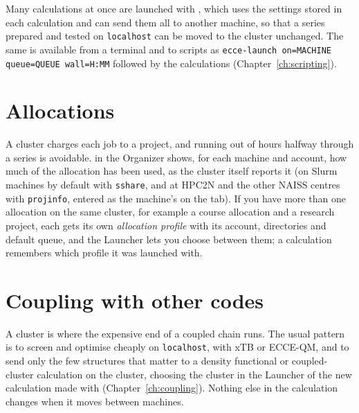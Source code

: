 Many calculations at once are launched with , which uses the settings stored in each calculation and can send them all to another machine, so that a series prepared and tested on \texttt{localhost} can be moved to the cluster unchanged. The same is available from a terminal and to scripts as \texttt{ecce-launch on=MACHINE queue=QUEUE wall=H:MM} followed by the calculations (Chapter~\ref{ch:scripting}).

\section{Allocations}
A cluster charges each job to a project, and running out of hours halfway through a series is avoidable.  in the Organizer shows, for each machine and account, how much of the allocation has been used, as the cluster itself reports it (on Slurm machines by default with \texttt{sshare}, and at HPC2N and the other NAISS centres with \texttt{projinfo}, entered as the machine's  on the  tab). If you have more than one allocation on the same cluster, for example a course allocation and a research project, each gets its own \emph{allocation profile} with its account, directories and default queue, and the Launcher lets you choose between them; a calculation remembers which profile it was launched with.

\section{Coupling with other codes}
A cluster is where the expensive end of a coupled chain runs. The usual pattern is to screen and optimise cheaply on \texttt{localhost}, with xTB or ECCE-QM, and to send only the few structures that matter to a density functional or coupled-cluster calculation on the cluster, choosing the cluster in the Launcher of the new calculation made with  (Chapter~\ref{ch:coupling}). Nothing else in the calculation changes when it moves between machines.

